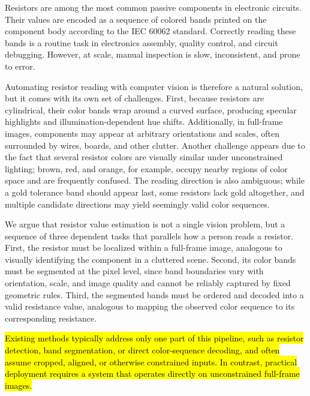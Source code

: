 \documentclass[conference]{IEEEtran}
\begin{document}
Resistors are among the most common passive components in electronic circuits. Their values are encoded as a sequence of colored bands printed on the component body according to the IEC 60062 standard. Correctly reading these bands is a routine task in electronics assembly, quality control, and circuit debugging. However, at scale, manual inspection is slow, inconsistent, and prone to error.

Automating resistor reading with computer vision is therefore a natural solution, but it comes with its own set of challenges. First, because resistors are cylindrical, their color bands wrap around a curved surface, producing specular highlights and illumination-dependent hue shifts. Additionally, in full-frame images, components may appear at arbitrary orientations and scales, often surrounded by wires, boards, and other clutter. Another challenge appears due to the fact that several resistor colors are visually similar under unconstrained lighting; brown, red, and orange, for example, occupy nearby regions of color space and are frequently confused. The reading direction is also ambiguous; while a gold tolerance band should appear last, some resistors lack gold altogether, and multiple candidate directions may yield seemingly valid color sequences.

We argue that resistor value estimation is not a single vision problem, but a sequence of three dependent tasks that parallels how a person reads a resistor. First, the resistor must be localized within a full-frame image, analogous to visually identifying the component in a cluttered scene. Second, its color bands must be segmented at the pixel level, since band boundaries vary with orientation, scale, and image quality and cannot be reliably captured by fixed geometric rules. Third, the segmented bands must be ordered and decoded into a valid resistance value, analogous to mapping the observed color sequence to its corresponding resistance.

\hl{Existing methods typically address only one part of this pipeline, such as resistor detection, band segmentation, or direct color-sequence decoding, and often assume cropped, aligned, or otherwise constrained inputs. In contrast, practical deployment requires a system that operates directly on unconstrained full-frame images.}
\end{document}

